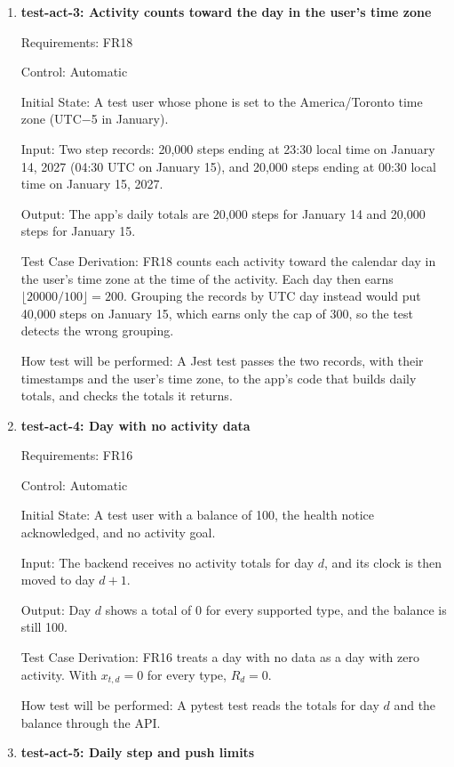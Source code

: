\documentclass[12pt, titlepage]{article}
\begin{document}
\begin{enumerate}
How test will be performed: As in test-act-1.

\item{\textbf{test-act-3: Activity counts toward the day in the user's time
zone}\\}

Requirements: FR18

Control: Automatic

Initial State: A test user whose phone is set to the America/Toronto time zone
(UTC$-$5 in January).

Input: Two step records: 20,000 steps ending at 23:30 local time on January
14, 2027 (04:30 UTC on January 15), and 20,000 steps ending at 00:30 local
time on January 15, 2027.

Output: The app's daily totals are 20,000 steps for January 14 and 20,000
steps for January 15.

Test Case Derivation: FR18 counts each activity toward the calendar day in the
user's time zone at the time of the activity. Each day then earns
$\lfloor 20000 / 100 \rfloor = 200$. Grouping the records by UTC day instead
would put 40,000 steps on January 15, which earns only the cap of 300, so the
test detects the wrong grouping.

How test will be performed: A Jest test passes the two records, with their
timestamps and the user's time zone, to the app's code that builds daily
totals, and checks the totals it returns.

\item{\textbf{test-act-4: Day with no activity data}\\}

Requirements: FR16

Control: Automatic

Initial State: A test user with a balance of 100, the health notice
acknowledged, and no activity goal.

Input: The backend receives no activity totals for day $d$, and its clock is
then moved to day $d+1$.

Output: Day $d$ shows a total of 0 for every supported type, and the balance
is still 100.

Test Case Derivation: FR16 treats a day with no data as a day with zero
activity. With $x_{t,d} = 0$ for every type, $R_d = 0$.

How test will be performed: A pytest test reads the totals for day $d$ and the
balance through the API.

\item{\textbf{test-act-5: Daily step and push limits}\\}


\end{enumerate}
\end{document}

